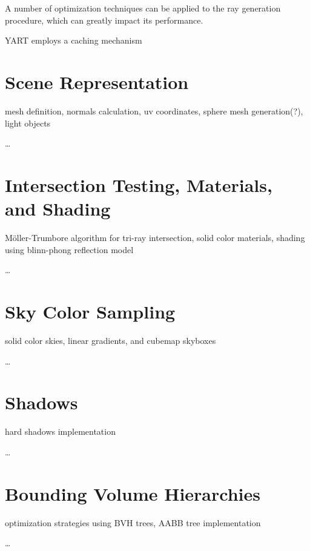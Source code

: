 A number of optimization techniques can be applied to the ray generation procedure, which can greatly impact its performance.

YART employs a caching mechanism

\section{Scene Representation}

mesh definition, normals calculation, uv coordinates, sphere mesh generation(?), light objects

\dots

\section{Intersection Testing, Materials, and Shading}

Möller-Trumbore algorithm for tri-ray intersection, solid color materials, shading using blinn-phong reflection model

\dots

\section{Sky Color Sampling}

solid color skies, linear gradients, and cubemap skyboxes

\dots

\section{Shadows}

hard shadows implementation

\dots

\section{Bounding Volume Hierarchies}

optimization strategies using BVH trees, AABB tree implementation

\dots
